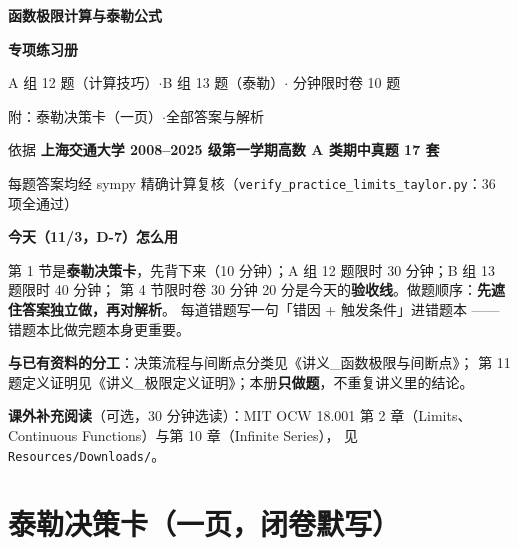 \documentclass[11pt,a4paper]{ctexart}
\begin{document}
\begin{titlepage}
\centering
\vspace*{1.8cm}
{\Huge\bfseries 函数极限计算与泰勒公式\par}
\vspace{0.45cm}
{\Huge\bfseries 专项练习册\par}
\vspace{0.9cm}
{\large A 组 12 题（计算技巧）\quad$\cdot$\quad B 组 13 题（泰勒）\quad$\cdot$ 分钟限时卷 10 题\par}
\vspace{0.5cm}
{\large 附：泰勒决策卡（一页）\quad$\cdot$\quad 全部答案与解析\par}
\vspace{1.2cm}
{\large 依据 \textbf{上海交通大学 2008--2025 级第一学期高数 A 类期中真题 17 套}\par}
\vspace{0.3cm}
{\large 每题答案均经 sympy 精确计算复核（\texttt{verify\_practice\_limits\_taylor.py}：36 项全通过）\par}
\vfill
{\small\begin{minipage}{0.9\textwidth}
\textbf{今天（11/3，D-7）怎么用}\par\vspace{2pt}
第 1 节是\textbf{泰勒决策卡}，先背下来（10 分钟）；A 组 12 题限时 30 分钟；B 组 13 题限时 40 分钟；
第 4 节限时卷 30 分钟 20 分是今天的\textbf{验收线}。做题顺序：\textbf{先遮住答案独立做，再对解析}。
每道错题写一句「错因 + 触发条件」进错题本 —— 错题本比做完题本身更重要。\par\vspace{3pt}
\textbf{与已有资料的分工}：决策流程与间断点分类见《讲义\_函数极限与间断点》；
第 11 题定义证明见《讲义\_极限定义证明》；本册\textbf{只做题}，不重复讲义里的结论。\par\vspace{3pt}
\textbf{课外补充阅读}（可选，30 分钟选读）：MIT OCW 18.001 第 2 章（Limits、Continuous Functions）与第 10 章（Infinite Series），
见 \texttt{Resources/Downloads/}。
\end{minipage}}
\end{titlepage}

\tableofcontents
\newpage

\section{泰勒决策卡（一页，闭卷默写）}
\end{document}
